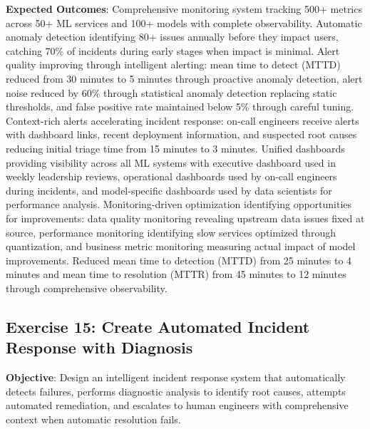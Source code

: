 \textbf{Expected Outcomes}: Comprehensive monitoring system tracking 500+ metrics across 50+ ML services and 100+ models with complete observability. Automatic anomaly detection identifying 80+ issues annually before they impact users, catching 70\% of incidents during early stages when impact is minimal. Alert quality improving through intelligent alerting: mean time to detect (MTTD) reduced from 30 minutes to 5 minutes through proactive anomaly detection, alert noise reduced by 60\% through statistical anomaly detection replacing static thresholds, and false positive rate maintained below 5\% through careful tuning. Context-rich alerts accelerating incident response: on-call engineers receive alerts with dashboard links, recent deployment information, and suspected root causes reducing initial triage time from 15 minutes to 3 minutes. Unified dashboards providing visibility across all ML systems with executive dashboard used in weekly leadership reviews, operational dashboards used by on-call engineers during incidents, and model-specific dashboards used by data scientists for performance analysis. Monitoring-driven optimization identifying opportunities for improvements: data quality monitoring revealing upstream data issues fixed at source, performance monitoring identifying slow services optimized through quantization, and business metric monitoring measuring actual impact of model improvements. Reduced mean time to detection (MTTD) from 25 minutes to 4 minutes and mean time to resolution (MTTR) from 45 minutes to 12 minutes through comprehensive observability.

\subsection{Exercise 15: Create Automated Incident Response with Diagnosis}

\textbf{Objective}: Design an intelligent incident response system that automatically detects failures, performs diagnostic analysis to identify root causes, attempts automated remediation, and escalates to human engineers with comprehensive context when automatic resolution fails.

